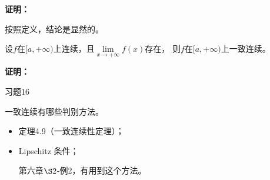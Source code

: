 \documentclass{article}
\begin{document}
\textbf{证明：}

按照定义，结论是显然的。

\begin{zremark}
  设$f$在$[a, +\infty)$上连续，且$\lim\limits_{x \to +\infty} f(x)$存在，
  则$f$在$[a, +\infty)$上一致连续。
\end{zremark}

\textbf{证明：}

习题16

\begin{zremark}
  一致连续有哪些判别方法。
\end{zremark}

\begin{itemize}
  \item 定理4.9（一致连续性定理）；
  \item Lipschitz 条件；

        第六章$\S 2$-例2，有用到这个方法。
\end{itemize}
\end{document}
